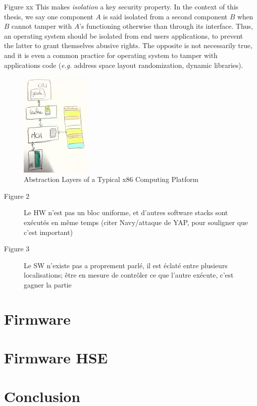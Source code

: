 \newpage

Figure xx
%
This makes \emph{isolation} a key security property.
%
In the context of this thesis, we say one component $A$ is said isolated from a
second component $B$ when $B$ cannot tamper with $A$'s functioning otherwise
than through its interface.
%
Thus, an operating system should be isolated from end users applications, to
prevent the latter to grant themselves abusive rights.
%
The opposite is not necessarily true, and it is even a common practice for
operating system to tamper with applications code (\emph{e.g.} address space
layout randomization, dynamic libraries).

\begin{figure}
  \centering
  \includegraphics[width=0.3\textwidth]{Figures/computing-platform-3.jpg}
  \caption{Abstraction Layers of a Typical x86 Computing Platform}
  \label{fig:usecase:computing-platform-3}
\end{figure}


\begin{description}
\item [Figure 2] Le HW n’est pas un bloc uniforme, et d’autres software stacks
  sont exécutés en même temps (citer Navy/attaque de YAP, pour souligner que
  c’est important)
\item [Figure 3] Le SW n'existe pas a proprement parlé, il est éclaté entre
  plusieurs localisations; être en mesure de contrôler ce que l’autre exécute,
  c’est gagner la partie
\end{description}


\section{Firmware}
\label{sec:usecase:firmware}

\section{Firmware HSE}
\label{sec:usecase:hse}

\section{Conclusion}
\label{sec:usecase:conclusion}
